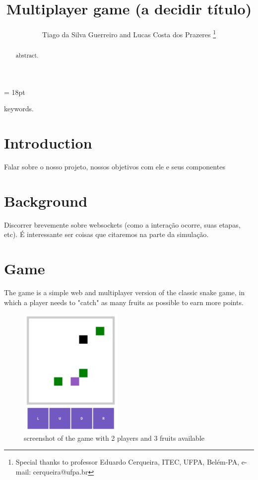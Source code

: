 \documentclass[english]{sbrt}
\begin{document}
\title{Multiplayer game (a decidir título)}

\author{Tiago da Silva Guerreiro and Lucas Costa dos Prazeres
    \thanks{Special thanks to professor Eduardo Cerqueira, ITEC, UFPA, Belém-PA, e-mail: cerqueira@ufpa.br}%
}

\maketitle

\baselineskip = 18pt


\begin{abstract}
    abstract.
\end{abstract}
\begin{keywords}
    keywords.
\end{keywords}

\section{\textbf{Introduction}}
Falar sobre o nosso projeto, nossos objetivos com ele e seus componentes

\section{\textbf{Background}}
Discorrer brevemente sobre websockets (como a interação ocorre, suas etapas, etc). É interessante ser coisas que citaremos na parte da simulação.

\section{\textbf{Game}}
The game is a simple web and multiplayer version of the classic snake game, in which a player needs to
"catch" as many fruits as possible to earn more points.

\begin{figure}[H]
  \centering
  \includegraphics[width=5cm]{game-screen.jpg}
  \caption{screenshot of the game with 2 players and 3 fruits available}
\end{figure}
\end{document}
